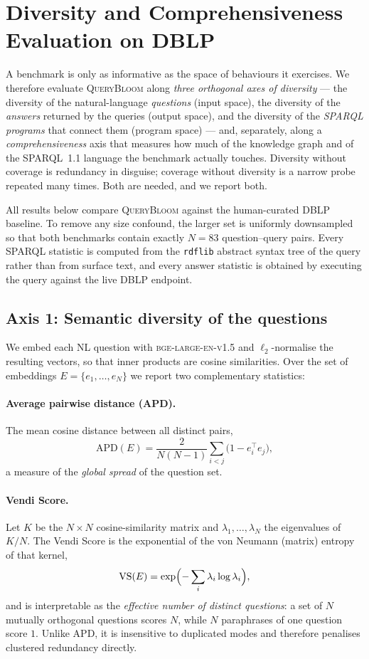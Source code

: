 \section{Diversity and Comprehensiveness Evaluation on DBLP}
\label{sec:dblp-diversity}

A benchmark is only as informative as the space of behaviours it exercises. We therefore
evaluate \textsc{QueryBloom} along \emph{three orthogonal axes of diversity} --- the
diversity of the natural-language \emph{questions} (input space), the diversity of the
\emph{answers} returned by the queries (output space), and the diversity of the
\emph{SPARQL programs} that connect them (program space) --- and, separately, along a
\emph{comprehensiveness} axis that measures how much of the knowledge graph and of the
SPARQL~1.1 language the benchmark actually touches. Diversity without coverage is
redundancy in disguise; coverage without diversity is a narrow probe repeated many times.
Both are needed, and we report both.

All results below compare \textsc{QueryBloom} against the human-curated DBLP baseline. To
remove any size confound, the larger set is uniformly downsampled so that both benchmarks
contain exactly $N{=}83$ question--query pairs. Every SPARQL statistic is computed from the
\texttt{rdflib} abstract syntax tree of the query rather than from surface text, and every
answer statistic is obtained by executing the query against the live DBLP endpoint.

\subsection{Axis 1: Semantic diversity of the questions}

We embed each NL question with \textsc{bge-large-en-v1.5} and $\ell_2$-normalise the
resulting vectors, so that inner products are cosine similarities. Over the set of
embeddings $E=\{e_1,\dots,e_N\}$ we report two complementary statistics:

\paragraph{Average pairwise distance (APD).} The mean cosine distance between all distinct
pairs,
\[
\mathrm{APD}(E)=\frac{2}{N(N-1)}\sum_{i<j}\bigl(1-e_i^{\top}e_j\bigr),
\]
a measure of the \emph{global spread} of the question set.

\paragraph{Vendi Score.} Let $K$ be the $N\times N$ cosine-similarity matrix and
$\lambda_1,\dots,\lambda_N$ the eigenvalues of $K/N$. The Vendi Score is the exponential of
the von Neumann (matrix) entropy of that kernel,
\[
\mathrm{VS}(E)=\exp\Bigl(-\sum_i \lambda_i \log \lambda_i\Bigr),
\]
and is interpretable as the \emph{effective number of distinct questions}: a set of $N$
mutually orthogonal questions scores $N$, while $N$ paraphrases of one question score $1$.
Unlike APD, it is insensitive to duplicated modes and therefore penalises clustered
redundancy directly.

